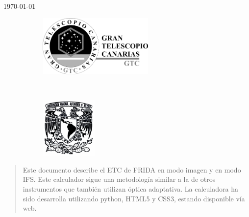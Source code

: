\begin{titlepage}

{\large \today}\\[2cm] %


\begin{figure}[h]
    \centering
    \begin{subfigure}[b]{0.5\textwidth}
        \centering
        \includegraphics[height=1.2in]{gtc}
    \end{subfigure}%
    ~ 
    \begin{subfigure}[b]{0.5\textwidth}
        \centering
        \includegraphics[height=1.2in]{unam}
    \end{subfigure}
\end{figure}
 

\vfill %

\end{titlepage}


\begin{abstract}
Este documento describe el ETC de FRIDA en modo imagen y en modo IFS. Este calculador sigue una metodolog\'ia similar a la de otros instrumentos que tambi\'en utilizan \'optica adaptativa. La calculadora ha sido desarrolla utilizando python, HTML5 y CSS3, estando disponible v\'ia web.
\end{abstract}
\printacronyms
